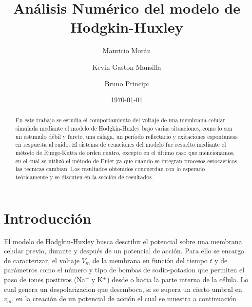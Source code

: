\documentclass[aps,prl,reprint,groupedaddress]{revtex4-2}
\begin{document}
\title{
Análisis Numérico del modelo de Hodgkin-Huxley
}

\author{Mauricio Morán}
\affiliation{}

\author{Kevin Gaston Mansilla}

\author{Bruno Principi}
\affiliation{}

\date{\today}

\begin{abstract}
En este trabajo se estudia el comportamiento del voltaje de una membrana celular
simulada mediante el modelo de Hodgkin-Huxley bajo varias situaciones, como 
lo son un estumulo débil y furete, una ráfaga, un período reflectario y 
exitaciones espontaneas en respuesta al ruido. El sistema de ecuaciones del 
modelo fue resuelto mediante el método de Runge-Kutta de orden cuatro, excepto 
en el último caso que mencionamos, en el cual se utilizó el método de Euler ya 
que cuando se integran procesos estocasticos las tecnicas cambian. Los 
resultados obtenidos concuerdan con lo esperado teóricamente y se 
discuten en la sección de resultados.
\end{abstract}


\maketitle

\section{Introducción}

El modelo de Hodgkin-Huxley busca describir el potencial sobre una membrana 
celular previo, durante y después de un potencial de acción. Para ello se encarga 
de caracterizar, el voltaje $V_{m}$ de la membrana en función del tiempo $t$ y 
de parámetros como el número y tipo de bombas de sodio-potasion que permiten 
el paso de iones positivos (Na$^{+}$ y K$^{+}$) desde o hacia la parte interna 
de la célula. Lo cual genera un despolarizacion que desemboca, si se supera 
un cierto umbral en $v_{m}$, en la creación de un potencial de acción el cual 
se muestra a continuación
\end{document}
